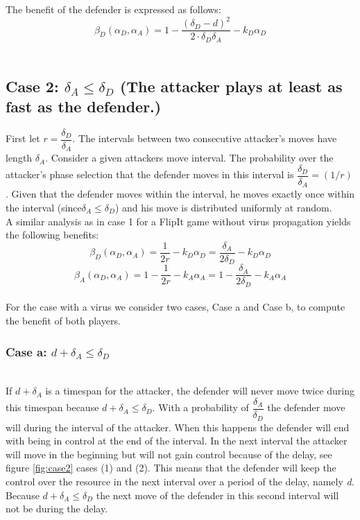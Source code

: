 \documentclass[journal,a4paper]{IEEEtran}
\begin{document}
 The benefit of the defender is expressed as follows:
 \begin{equation}\label{first}
\beta_{D}(\alpha_{D},\alpha_{A}) = 1 - \dfrac { (\delta_{D}-d) ^{2}} {2 \cdot \delta_{D}  \delta_{A}} - k_{D} \alpha_{D}
\end{equation}
~~\\



\subsection*{\textbf{Case 2:} $\delta_{A} \leq \delta_{D} $ (The attacker plays at least as fast as the defender.) }

First let $r = \dfrac{\delta_{D}}{ \delta_{A} }$. The intervals between two consecutive attacker's moves have length $\delta_{A}$. Consider a given attackers move interval. The probability over the attacker's phase selection that the defender moves in this interval is $\dfrac{\delta_{D}}{ \delta_{A} } = (1/r)$. Given that the defender moves within the interval, he moves exactly once within the interval (since$\delta_{A} \leq \delta_{D} $) and his move is distributed uniformly at random. \\

A similar analysis as in case 1 for a FlipIt game without virus propagation yields the following benefits:
\begin{equation}\label{first}
\beta_{D}(\alpha_{D},\alpha_{A}) = \dfrac {1} {2r} - k_{D} \alpha_{D} = \dfrac {\delta_{A}} {2\delta_{D}} - k_{D} \alpha_{D} 
\end{equation}
\begin{equation}\label{first}
\beta_{A}(\alpha_{D},\alpha_{A}) =1 - \dfrac {1} {2r} - k_{A} \alpha_{A} = 1- \dfrac {\delta_{A}} {2\delta_{D}} - k_{A} \alpha_{A}  
\end{equation}\\


For the case with a virus we consider two cases, Case a and Case b, to compute the benefit of both players.  \\


\subsubsection*{\textbf{Case a:} $d + \delta_{A} \leq \delta_{D}$}
~~\\
If $d + \delta_{A}$  is a timespan for the attacker, the defender will never move twice during this timespan because $d + \delta_{A} \leq \delta_{D}$. With a probability of $\dfrac{\delta_{A}}{\delta_{D}} $ the defender move will during the interval of the attacker. When this happens the defender will end with being in control at the end of the interval. In the next interval the attacker will move in the beginning but will not gain control because of the delay, see figure \ref{fig:case2} cases (1) and (2). This means that the defender will keep the control over the resource in the next interval over a period of the delay, namely \textit{d}. Because $d + \delta_{A} \leq \delta_{D}$ the next move of the defender in this second interval will not be during the delay. 
\end{document}
